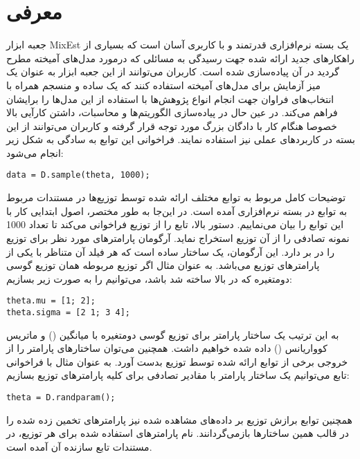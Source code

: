 \section{معرفی}
جعبه ابزار
MixEst
یک بسته نرم‌افزاری قدرتمند و با کاربری آسان است که بسیاری از راهکارهای جدید ارائه شده جهت رسیدگی به مسائلی که درمورد مدل‌های آمیخته مطرح گردید در آن پیاده‌سازی شده است.
کاربران می‌توانند از این جعبه ابزار به عنوان یک میز آزمایش برای مدل‌های آمیخته استفاده کنند که یک
{}
ساده و منسجم همراه با انتخاب‌های فراوان جهت انجام انواع پژوهش‌ها با استفاده از این مدل‌ها را برایشان فراهم می‌کند.
در عین حال در پیاده‌سازی الگوریتم‌ها و محاسبات، داشتن کارآیی بالا خصوصا هنگام کار با دادگان بزرگ مورد توجه قرار گرفته و کاربران می‌توانند از این بسته در کاربردهای عملی نیز استفاده نمایند.
فراخوانی این توابع به سادگی به شکل زیر انجام می‌شود:
\begin{latin}
\begin{lstlisting}
data = D.sample(theta, 1000);
\end{lstlisting}
\end{latin}
توضیحات کامل مربوط به توابع مختلف ارائه شده توسط توزیع‌ها در مستندات مربوط به توابع در بسته نرم‌افزاری آمده است.
در این‌جا به طور مختصر، اصول ابتدایی کار با این توابع را بیان می‌نماییم.
دستور بالا، تابع
را از توزیع
فراخوانی می‌کند تا تعداد 1000 نمونه تصادفی را از آن توزیع استخراج نماید.
آرگومان
پارامترهای مورد نظر برای توزیع را در بر دارد.
این آرگومان، یک ساختار ساده است که هر فیلد آن متناظر با یکی از پارامترهای توزیع می‌باشد.
به عنوان مثال اگر توزیع مربوطه همان توزیع گوسی دومتغیره که در بالا ساخته شد باشد، می‌توانیم
را به صورت زیر بسازیم:
\begin{latin}
	\begin{lstlisting}
theta.mu = [1; 2];
theta.sigma = [2 1; 3 4];
	\end{lstlisting}
\end{latin}
به این ترتیب یک ساختار پارامتر برای توزیع گوسی دومتغیره با میانگین
()
و ماتریس کوواریانس
()
داده شده خواهیم داشت.
همچنین می‌توان ساختارهای پارامتر را از خروجی برخی از توابع ارائه شده توسط توزیع بدست آورد.
به عنوان مثال با فراخوانی تابع
می‌توانیم یک ساختار پارامتر با مقادیر تصادفی برای کلیه پارامترهای توزیع بسازیم:
\begin{latin}
	\begin{lstlisting}
theta = D.randparam();
	\end{lstlisting}
\end{latin}
همچنین توابع برازش توزیع بر داده‌های مشاهده شده نیز پارامترهای تخمین زده شده را در قالب همین ساختارها بازمی‌گردانند.
نام پارامترهای استفاده شده برای هر توزیع، در مستندات تابع سازنده آن آمده است.

